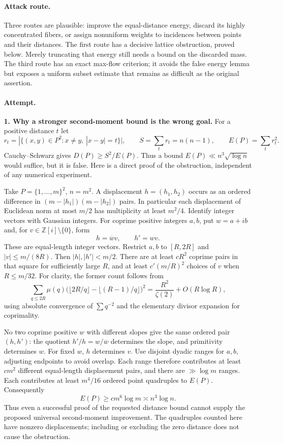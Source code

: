 \documentclass[11pt,a4paper]{article}
\newcommand{\Z}{\mathbb{Z}}
\numberwithin{equation}{section}
\begin{document}
\paragraph{Attack route.}
Three routes are plausible: improve the equal-distance energy, discard
its highly concentrated fibers, or assign nonuniform weights to incidences
between points and their distances. The first route has a decisive lattice
obstruction, proved below. Merely truncating that energy still needs a
bound on the discarded mass. The third route has an exact max-flow
criterion; it avoids the false energy lemma but exposes a uniform subset
estimate that remains as difficult as the original assertion.

\paragraph{Attempt.}
\textbf{1. Why a stronger second-moment bound is the wrong goal.}
For a positive distance $t$ let
\[
 r_t=|\{(x,y)\in P^2:x\ne y,\ |x-y|=t\}|,
 \qquad S=\sum_t r_t=n(n-1),\qquad E(P)=\sum_t r_t^2.
\]
Cauchy--Schwarz gives $D(P)\ge S^2/E(P)$. Thus a bound
$E(P)\ll n^3\sqrt{\log n}$ would suffice, but it is false.
Here is a direct proof of the obstruction, independent of any numerical
experiment.

Take $P=\{1,\ldots,m\}^2$, $n=m^2$. A displacement
$h=(h_1,h_2)$ occurs as an ordered difference in
$(m-|h_1|)(m-|h_2|)$ pairs. In particular each displacement of Euclidean
norm at most $m/2$ has multiplicity at least $m^2/4$. Identify integer
vectors with Gaussian integers. For coprime positive integers $a,b$,
put $w=a+ib$ and, for $v\in\Z[i]\setminus\{0\}$, form
\[
 h=\overline w v,\qquad h'=wv.
\]
These are equal-length integer vectors. Restrict $a,b$ to $[R,2R]$ and
$|v|\le m/(8R)$. Then $|h|,|h'|<m/2$. There are at least $cR^2$
coprime pairs in that square for sufficiently large $R$, and at least
$c'(m/R)^2$ choices of $v$ when $R\le m/32$. For clarity, the former
count follows from
\[
 \sum_{q\le2R}\mu(q)
 \bigl(\lfloor2R/q\rfloor-\lfloor(R-1)/q\rfloor\bigr)^2
 =\frac{R^2}{\zeta(2)}+O(R\log R),
\]
using absolute convergence of $\sum q^{-2}$ and the elementary divisor
expansion for coprimality.

No two coprime positive $w$ with different slopes give the same ordered
pair $(h,h')$: the quotient $h'/h=w/\overline w$ determines the slope,
and primitivity determines $w$. For fixed $w$, $h$ determines $v$.
Use disjoint dyadic ranges for $a,b$, adjusting endpoints to avoid overlap.
Each range therefore contributes at least $cm^2$ different equal-length
displacement pairs, and there are $\gg\log m$ ranges. Each contributes
at least $m^4/16$ ordered point quadruples to $E(P)$. Consequently
\begin{equation}\label{30006795:lattice}
 E(P)\ge c m^6\log m\asymp n^3\log n.
\end{equation}
Thus even a successful proof of the requested distance bound cannot
supply the proposed universal second-moment improvement. The quadruples
counted here have nonzero displacements; including or excluding the zero
distance does not cause the obstruction.
\end{document}
